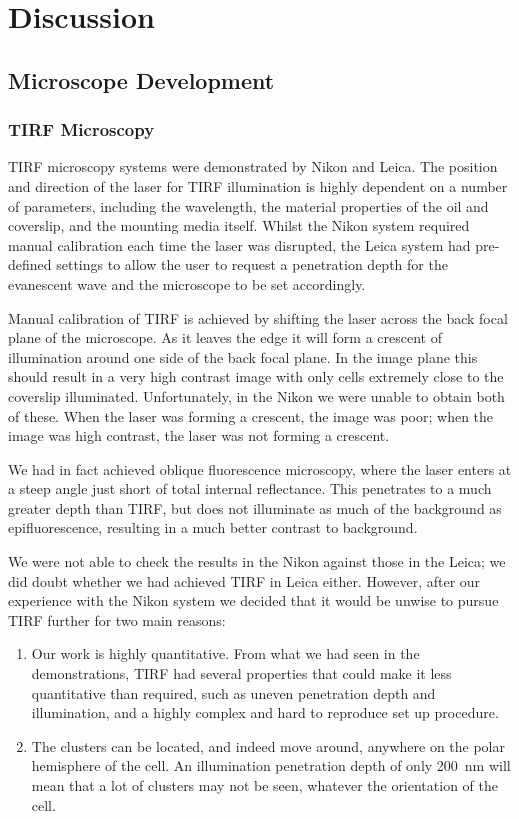 \documentclass[../main.tex]{subfiles}
\begin{document}
\section{Discussion}

\subsection{Microscope Development}

\subsubsection{TIRF Microscopy}
TIRF microscopy systems were demonstrated by Nikon and Leica. The position and direction of the laser for TIRF illumination is highly dependent on a number of parameters, including the wavelength, the material properties of the oil and coverslip, and the mounting media itself. Whilst the Nikon system required manual calibration each time the laser was disrupted, the Leica system had pre-defined settings to allow the user to request a penetration depth for the evanescent wave and the microscope to be set accordingly.

Manual calibration of TIRF is achieved by shifting the laser across the back focal plane of the microscope. As it leaves the edge it will form a crescent of illumination around one side of the back focal plane. In the image plane this should result in a very high contrast image with only cells extremely close to the coverslip illuminated. Unfortunately, in the Nikon we were unable to obtain both of these. When the laser was forming a crescent, the image was poor; when the image was high contrast, the laser was not forming a crescent.

We had in fact achieved oblique fluorescence microscopy, where the laser enters at a steep angle just short of total internal reflectance. This penetrates to a much greater depth than TIRF, but does not illuminate as much of the background as epifluorescence, resulting in a much better contrast to background.

We were not able to check the results in the Nikon against those in the Leica; we did doubt whether we had achieved TIRF in Leica either. However, after our experience with the Nikon system we decided that it would be unwise to pursue TIRF further for two main reasons:

\begin{enumerate}
	\item Our work is highly quantitative. From what we had seen in the demonstrations, TIRF had several properties that could make it less quantitative than required, such as uneven penetration depth and illumination, and a highly complex and hard to reproduce set up procedure.
	\item The clusters can be located, and indeed move around, anywhere on the polar hemisphere of the cell. An illumination penetration depth of only \SI{200}{\nano\meter} will mean that a lot of clusters may not be seen, whatever the orientation of the cell. 
\end{enumerate}
\end{document}
